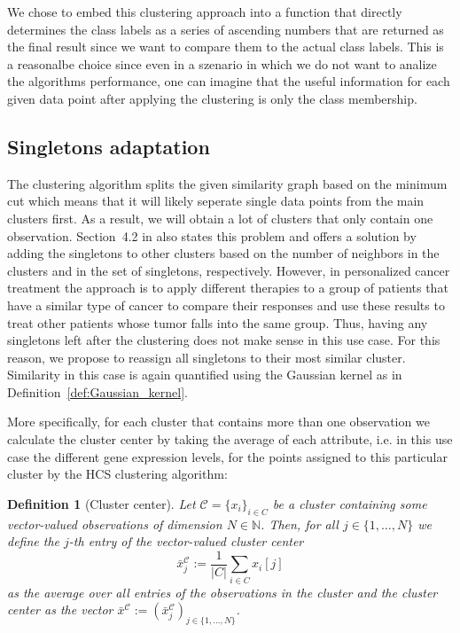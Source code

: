 \documentclass[paper=a4,fontsize=11pt,DIV=8,BCOR=5mm,twoside,pdftex,bibtotocnumbered]{scrreprt}
\newcommand{\N}{{\mathbb N}}
\theoremstyle{plain}
\newtheorem{definition}[proposition]{Definition}
\begin{document}
We chose to embed this clustering approach into a function that directly determines the class labels as a series of ascending numbers that are returned as the final result since we want to compare them to the actual class labels. This is a reasonalbe choice since even in a szenario in which we do not want to analize the algorithms performance, one can imagine that the useful information for each given data point after applying the clustering is only the class membership.

\subsection{Singletons adaptation}\label{subsec:singletons}
The clustering algorithm splits the given similarity graph based on the minimum cut which means that it will likely seperate single data points from the main clusters first. As a result, we will obtain a lot of clusters that only contain one observation. Section~4.2 in \cite{Hartuv2000} also states this problem and offers a solution by adding the singletons to other clusters based on the number of neighbors in the clusters and in the set of singletons, respectively. However, in personalized cancer treatment the approach is to apply different therapies to a group of patients that have a similar type of cancer to compare their responses and use these results to treat other patients whose tumor falls into the same group. Thus, having any singletons left after the clustering does not make sense in this use case. For this reason, we propose to reassign all singletons to their most similar cluster. Similarity in this case is again quantified using the Gaussian kernel as in Definition~\ref{def:Gaussian_kernel}. 

More specifically, for each cluster that contains more than one observation we calculate the cluster center by taking the average of each attribute, i.e. in this use case the different gene expression levels, for the points assigned to this particular cluster by the HCS clustering algorithm:

\begin{definition}[Cluster center]\label{def:cluster_center}
	Let $\mathcal{C} = \{x_i\}_{i\in C}$ be a cluster containing some vector-valued observations of dimension $N\in\N$. Then, for all $j\in\{1, \dots, N\}$ we define the $j$-th entry of the vector-valued cluster center
	\[
		\bar{x}^{\mathcal C}_j := \frac{1}{|C|} \sum_{i\in C} x_i[j]
	\] 
	as the average over all entries of the observations in the cluster and the \emph{cluster center} as the vector $\bar{x}^{\mathcal C}:=(\bar{x}^{\mathcal C}_j)_{j\in\{1, \dots, N\}}$.
\end{definition}
\end{document}
